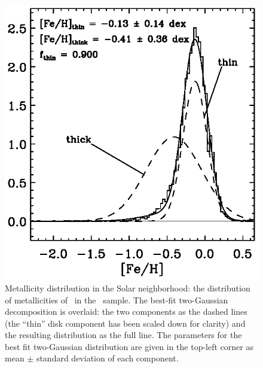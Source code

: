 \clearpage
\begin{figure}
\includegraphics{figs_groups/gcs_zdist.ps}
\caption[Metallicity distribution in the Solar
  neighborhood]{Metallicity distribution in the Solar neighborhood:
  the distribution of metallicities of \ngcsstars\ in the \gcsabb\
  sample. The best-fit two-Gaussian decomposition is overlaid: the two
  components as the dashed lines (the ``thin'' disk component has been
  scaled down for clarity) and the resulting distribution as the full
  line. The parameters for the best fit two-Gaussian distribution are
  given in the top-left corner as mean $\pm$ standard deviation of
  each component.}\label{fig:gcs_z}
\end{figure}


